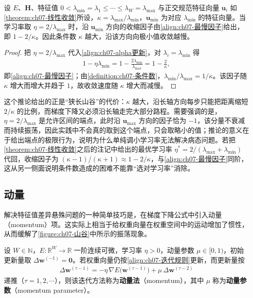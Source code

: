 \documentclass[../../main.tex]{subfiles}
\begin{document}
\begin{corollary}[最慢方向的收敛速度]\label{corollary:ch07-最慢方向}
设 $E$、$\mathbf{H}$、特征值 $0<\lambda_{\min}=\lambda_1\leqslant\cdots\leqslant\lambda_W=\lambda_{\max}$ 与正交规范特征向量 $\mathbf{u}_i$ 如\cref{theorem:ch07-线性收敛}所设，$\kappa=\lambda_{\max}/\lambda_{\min}$，$\mathbf{u}_{\min}$ 为对应 $\lambda_{\min}$ 的特征向量。当学习率取 $\eta=2/\lambda_{\max}$ 时，沿 $\mathbf{u}_{\min}$ 方向的收缩因子由\eqref{align:ch07-最慢因子}给出，即 $1-2/\kappa$。因此条件数 $\kappa$ 越大，沿该方向向极小值收敛越慢。
\end{corollary}
\begin{proof}
把 $\eta=2/\lambda_{\max}$ 代入\eqref{align:ch07-alpha更新}，对 $\lambda_i=\lambda_{\min}$ 得
\begin{align*}
1-\eta\lambda_{\min} = 1-\frac{2\lambda_{\min}}{\lambda_{\max}} = 1-\frac{2}{\kappa},
\end{align*}
即\eqref{align:ch07-最慢因子}；由\cref{definition:ch07-条件数}，$\lambda_{\min}/\lambda_{\max}=1/\kappa$。该因子随 $\kappa$ 增大而增大并趋于 $1$，故收敛速度随 $\kappa$ 增大而减慢。
\end{proof}

\begin{remark}
这个推论给出的正是“狭长山谷”的代价：$\kappa$ 越大，沿长轴方向每步只能把距离缩短 $2/\kappa$ 的比例，而梯度下降又必须沿长轴走完大部分路程。需要强调的是，$\eta=2/\lambda_{\max}$ 是允许区间的端点，此时沿 $\mathbf{u}_{\max}$ 方向的因子恰为 $-1$，该分量不衰减而持续振荡，因此实践中不会真的取到这个端点，只会取略小的值；推论的意义在于给出端点的极限行为，说明为什么单纯调小学习率无法解决病态问题。若把\cref{theorem:ch07-线性收敛}之后的注记中给出的最优学习率 $\eta^{\ast}=2/(\lambda_{\max}+\lambda_{\min})$ 代回，收缩因子为 $(\kappa-1)/(\kappa+1)\approx1-2/\kappa$，与\eqref{align:ch07-最慢因子}同阶，这从另一侧面说明条件数造成的困难不能靠“选对学习率”消除。
\end{remark}

\subsection{动量}\label{subsection:ch07-动量}

解决特征值差异悬殊问题的一种简单技巧是，在梯度下降公式中引入动量（momentum）项。这实际上相当于给权重向量在权重空间中的运动增加了惯性，从而缓解了\cref{figure:ch07-山谷}中所示的振荡现象。

\begin{definition}[动量]\label{definition:ch07-动量}
设 $W\in\mathbb{N}$，$E:\mathbb{R}^{W}\to\mathbb{R}$ 一阶连续可微，学习率 $\eta>0$，动量参数 $\mu\in[0,1)$，初始更新量取 $\Delta\mathbf{w}^{(-1)}=\mathbf{0}$。若权重向量仍按\eqref{align:ch07-迭代规则}更新，而更新量按
\begin{align}
\Delta\mathbf{w}^{(\tau-1)} = -\eta\,\nabla E\bigl(\mathbf{w}^{(\tau-1)}\bigr)+\mu\,\Delta\mathbf{w}^{(\tau-2)}
\label{align:ch07-动量更新}
\end{align}
递推（$\tau=1,2,\cdots$），则该迭代方法称为\textbf{动量法}（momentum），其中 $\mu$ 称为\textbf{动量参数}（momentum parameter）。
\end{definition}
\end{document}
